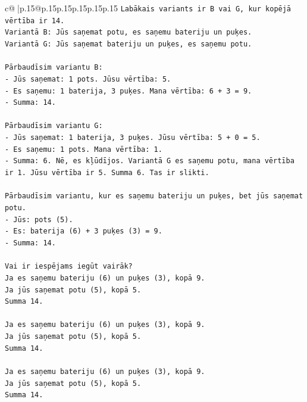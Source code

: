 \documentclass{article}
\begin{document}
{\begin{supertabular}{c@{$\;$}|p{.15\linewidth}@{}p{.15\linewidth}p{.15\linewidth}p{.15\linewidth}p{.15\linewidth}p{.15\linewidth}}
{{{\texttt{Labākais variants ir B vai G, kur kopējā vērtība ir 14.} \\
\texttt{Variantā B: Jūs saņemat potu, es saņemu bateriju un puķes.} \\
\texttt{Variantā G: Jūs saņemat bateriju un puķes, es saņemu potu.} \\
\\ 
\texttt{Pārbaudīsim variantu B:} \\
\texttt{{-} Jūs saņemat: 1 pots. Jūsu vērtība: 5.} \\
\texttt{{-} Es saņemu: 1 baterija, 3 puķes. Mana vērtība: 6 + 3 = 9.} \\
\texttt{{-} Summa: 14.} \\
\\ 
\texttt{Pārbaudīsim variantu G:} \\
\texttt{{-} Jūs saņemat: 1 baterija, 3 puķes. Jūsu vērtība: 5 + 0 = 5.} \\
\texttt{{-} Es saņemu: 1 pots. Mana vērtība: 1.} \\
\texttt{{-} Summa: 6. Nē, es kļūdījos. Variantā G es saņemu potu, mana vērtība ir 1. Jūsu vērtība ir 5. Summa 6. Tas ir slikti.} \\
\\ 
\texttt{Pārbaudīsim variantu, kur es saņemu bateriju un puķes, bet jūs saņemat potu.} \\
\texttt{{-} Jūs: pots (5).} \\
\texttt{{-} Es: baterija (6) + 3 puķes (3) = 9.} \\
\texttt{{-} Summa: 14.} \\
\\ 
\texttt{Vai ir iespējams iegūt vairāk?} \\
\texttt{Ja es saņemu bateriju (6) un puķes (3), kopā 9.} \\
\texttt{Ja jūs saņemat potu (5), kopā 5.} \\
\texttt{Summa 14.} \\
\\ 
\texttt{Ja es saņemu bateriju (6) un puķes (3), kopā 9.} \\
\texttt{Ja jūs saņemat potu (5), kopā 5.} \\
\texttt{Summa 14.} \\
\\ 
\texttt{Ja es saņemu bateriju (6) un puķes (3), kopā 9.} \\
\texttt{Ja jūs saņemat potu (5), kopā 5.} \\
\texttt{Summa 14.} \\
\\ 
}}}
\end{supertabular}}
\end{document}

